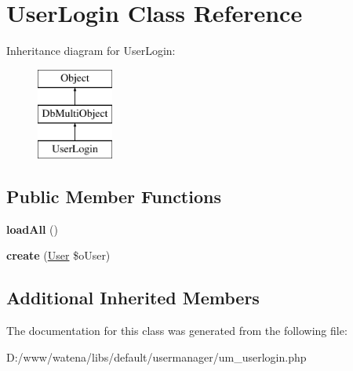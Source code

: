 \hypertarget{class_user_login}{\section{User\-Login Class Reference}
\label{class_user_login}
}
Inheritance diagram for User\-Login\-:\begin{figure}[H]
\begin{center}
\leavevmode
\includegraphics[height=3.000000cm]{class_user_login}
\end{center}
\end{figure}
\subsection*{Public Member Functions}
\begin{DoxyCompactItemize}
\item 
\hypertarget{class_user_login_a975629bdf2af323878074ea904394ecd}{{\bfseries load\-All} ()}\label{class_user_login_a975629bdf2af323878074ea904394ecd}

\item 
\hypertarget{class_user_login_a6c73cff42fe49c6a0af270f209dd5ea3}{{\bfseries create} (\hyperlink{class_user}{User} \$o\-User)}\label{class_user_login_a6c73cff42fe49c6a0af270f209dd5ea3}

\end{DoxyCompactItemize}
\subsection*{Additional Inherited Members}


The documentation for this class was generated from the following file\-:\begin{DoxyCompactItemize}
\item 
D\-:/www/watena/libs/default/usermanager/um\-\_\-userlogin.\-php\end{DoxyCompactItemize}
